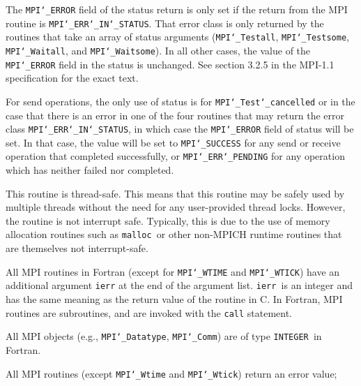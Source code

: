 \par
{}
\par
The {\tt MPI{\tt \char`\_}ERROR} field of the status return is only set if
the return from the MPI routine is {\tt MPI{\tt \char`\_}ERR{\tt \char`\_}IN{\tt \char`\_}STATUS}.  That error class
is only returned by the routines that take an array of status arguments
({\tt MPI{\tt \char`\_}Testall}, {\tt MPI{\tt \char`\_}Testsome}, {\tt MPI{\tt \char`\_}Waitall}, and {\tt MPI{\tt \char`\_}Waitsome}).  In
all other cases, the value of the {\tt MPI{\tt \char`\_}ERROR} field in the status is
unchanged.  See section 3.2.5 in the MPI-1.1 specification for the
exact text.
\par
For send operations, the only use of status is for {\tt MPI{\tt \char`\_}Test{\tt \char`\_}cancelled} or
in the case that there is an error in one of the four routines that
may return the error class {\tt MPI{\tt \char`\_}ERR{\tt \char`\_}IN{\tt \char`\_}STATUS}, in which case the
{\tt MPI{\tt \char`\_}ERROR} field of status will be set.  In that case, the value
will be set to {\tt MPI{\tt \char`\_}SUCCESS} for any send or receive operation that completed
successfully, or {\tt MPI{\tt \char`\_}ERR{\tt \char`\_}PENDING} for any operation which has neither
failed nor completed.
\par
{}
\par
This routine is thread-safe.  This means that this routine may be
safely used by multiple threads without the need for any user-provided
thread locks.  However, the routine is not interrupt safe.  Typically,
this is due to the use of memory allocation routines such as {\tt malloc
}or other non-MPICH runtime routines that are themselves not interrupt-safe.
\par
{}
All MPI routines in Fortran (except for {\tt MPI{\tt \char`\_}WTIME} and {\tt MPI{\tt \char`\_}WTICK}) have
an additional argument {\tt ierr} at the end of the argument list.  {\tt ierr
}is an integer and has the same meaning as the return value of the routine
in C.  In Fortran, MPI routines are subroutines, and are invoked with the
{\tt call} statement.
\par
All MPI objects (e.g., {\tt MPI{\tt \char`\_}Datatype}, {\tt MPI{\tt \char`\_}Comm}) are of type {\tt INTEGER
}in Fortran.
\par
{}
\par
All MPI routines (except {\tt MPI{\tt \char`\_}Wtime} and {\tt MPI{\tt \char`\_}Wtick}) return an error value;
